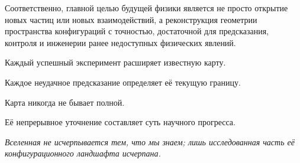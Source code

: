 Соответственно, главной целью будущей физики является не просто открытие новых частиц или новых взаимодействий, а реконструкция геометрии пространства конфигураций с точностью, достаточной для предсказания, контроля и инженерии ранее недоступных физических явлений.

Каждый успешный эксперимент расширяет известную карту.

Каждое неудачное предсказание определяет её текущую границу.

Карта никогда не бывает полной.

Её непрерывное уточнение составляет суть научного прогресса.

\begin{flushright}
\emph{
Вселенная не исчерпывается тем, что мы знаем;
лишь исследованная часть её конфигурационного ландшафта исчерпана.
}
\end{flushright}
